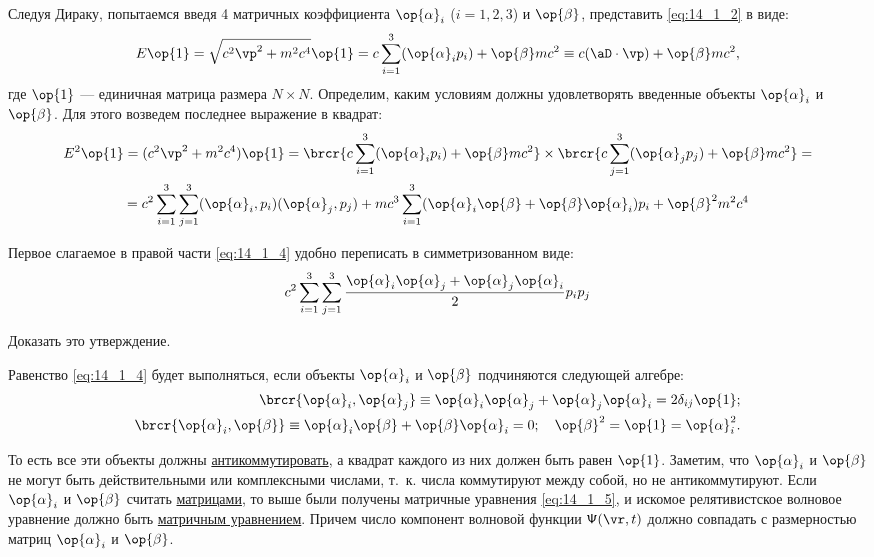 Следуя Дираку, попытаемся введя 4 матричных коэффициента $\op{\alpha}_i$ ($i = 1, 2, 3$) и $\op{\beta}$, представить \eqref{eq:14_1_2} в виде:
\begin{equation}
\label{eq:14_1_3}
E \op{1} = \sqrt{c^2 \vp^2 + m^2 c^4} \op{1} = c \sum_{i=1}^3 (\op{\alpha}_i p_i) + \op{\beta} mc^2 \equiv c(\aD \cdot \vp) + \op{\beta} mc^2,
\end{equation}
где $\op{1}$ --- единичная матрица размера $N \times N$. Определим, каким условиям должны удовлетворять введенные объекты $\op{\alpha}_i$ и $\op{\beta}$. Для этого возведем последнее выражение в квадрат:
\begin{gather}
E^2 \op{1} = (c^2 \vp^2 + m^2 c^4)\op{1} = \brcr{c \sum_{i=1}^3 (\op{\alpha}_i p_i) + \op{\beta} mc^2} \times \brcr{c \sum_{j=1}^3 (\op{\alpha}_j p_j) + \op{\beta} mc^2} = \nonumber \\
\label{eq:14_1_4}
= {c^2 \sum_{i=1}^3 \sum_{j = 1}^3 (\op{\alpha}_i, p_i)(\op{\alpha}_j, p_j)} + mc^3 \sum_{i=1}^3 (\op{\alpha}_i \op{\beta} + \op{\beta} \op{\alpha}_i) p_i + \op{\beta}^2 m^2 c^4
\end{gather}

Первое слагаемое в правой части \eqref{eq:14_1_4} удобно переписать в симметризованном виде:
$$
c^2 \sum_{i=1}^3 \sum_{j = 1}^3 \frac{ \op{\alpha}_i \op{\alpha}_j + \op{\alpha}_j \op{\alpha}_i }{2} p_i p_j
$$

\begin{excr}
Доказать это утверждение.
\end{excr}

Равенство \eqref{eq:14_1_4} будет выполняться, если объекты $\op{\alpha}_i$ и $\op{\beta}$ подчиняются следующей алгебре:
\begin{eqnarray}
\label{eq:14_1_5}
  \brcr{\op{\alpha}_i, \op{\alpha}_j } \equiv \op{\alpha}_i \op{\alpha}_j  + \op{\alpha}_j \op{\alpha}_i = 2 \delta_{ij} \op{1}; \nonumber \\
  \brcr{\op{\alpha}_i, \op{\beta} } \equiv \op{\alpha}_i \op{\beta} + \op{\beta} \op{\alpha}_i = 0;~~~\op{\beta}^2 = \op{1} = \op{\alpha}_i^2.
\end{eqnarray}

То есть все эти объекты должны \underline{антикоммутировать}, а квадрат каждого из них должен быть равен $\op{1}$. Заметим, что $\op{\alpha}_i$ и $\op{\beta}$ не могут быть действительными или комплексными числами, т.~к. числа коммутируют между собой, но не антикоммутируют. Если $\op{\alpha}_i$ и $\op{\beta}$ считать \underline{матрицами}, то выше были получены матричные уравнения \eqref{eq:14_1_5}, и искомое релятивистское волновое уравнение должно быть \underline{матричным уравнением}. Причем число компонент волновой функции $\mathsf{\Psi}(\vr, t)$ должно совпадать с размерностью матриц $\op{\alpha}_i$ и $\op{\beta}$. 

